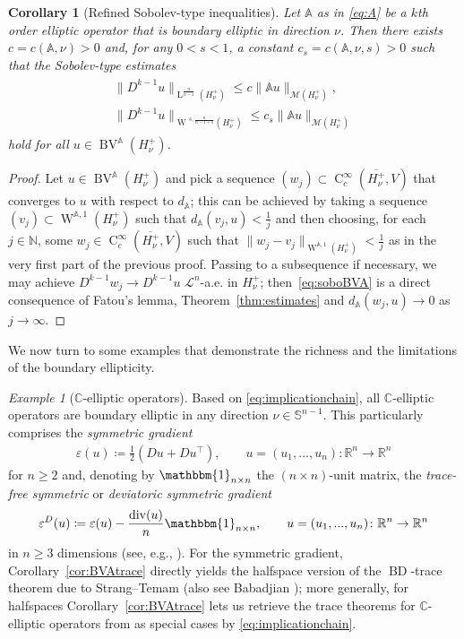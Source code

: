 \documentclass[a4paper,10pt]{amsart}
\newcommand{\R}{\mathbb R}
\renewcommand{\leq}{\leqslant}
\newcommand{\lebe}{\operatorname{L}}
\newcommand{\sobo}{\operatorname{W}}
\newcommand{\hold}{\operatorname{C}}
\newcommand{\bv}{\operatorname{BV}}
\newcommand{\A}{\mathbb{A}}
\newcommand{\bd}{\operatorname{BD}}
\numberwithin{equation}{section}
\newtheorem{corollary}[theorem]{Corollary}
\theoremstyle{remark}
\newtheorem{example}[theorem]{Example}
\numberwithin{equation}{section}
\begin{document}
	\begin{corollary}[Refined Sobolev-type inequalities]\label{cor:SobBVA}
		Let $\A$ as in \eqref{eq:A} be a $k$th order elliptic operator that is boundary elliptic in direction $\nu$.
		Then there exists $c=c(\A,\nu)>0$ and, for any $0<s<1$, a constant $c_{s}=c(\A,\nu,s)>0$ such that the Sobolev-type estimates
		\begin{align}\label{eq:soboBVA}
			\begin{split}
				\|D^{k-1}u\|_{\lebe^{\frac{n}{n-1}}(H^+_\nu)}\leq c\|\A u\|_{\mathcal M(H^+_\nu)},\\ 
				\|D^{k-1}u\|_{\dot{\sobo}{^{s,\frac{n}{n-1+s}}}(H^{+}_{\nu})}\leq c_{s}\|\A u\|_{\mathcal{M}(H^{+}_{\nu})}
			\end{split}
		\end{align}
		hold for all $u\in\bv^\A(H^+_\nu)$.
	\end{corollary} 
	\begin{proof}
		Let $u\in\bv^{\A}(H_{\nu}^{+})$ and pick a sequence $(w_{j})\subset\hold_{c}^{\infty}(\overline{H_{\nu}^{+}},V)$ that converges to $u$ with respect to $d_{\A}$; this can be achieved by taking a sequence $(v_{j})\subset\sobo^{\A,1}(H_{\nu}^{+})$ such that $d_{\A}(v_{j},u)<\frac{1}{j}$ and then choosing, for each $j\in\mathbb{N}$, some $w_{j}\in\hold_{c}^{\infty}(\overline{H_{\nu}^{+}},V)$ such that $\|w_{j}-v_{j}\|_{\sobo^{\A,1}(H_{\nu}^{+})}<\frac{1}{j}$ as in the very first part of the previous proof. Passing to a subsequence if necessary, we may achieve $D^{k-1}w_{j}\to D^{k-1}u$ $\mathscr{L}^{n}$-a.e. in $H_{\nu}^{+}$; then~\eqref{eq:soboBVA} is a direct consequence of Fatou's lemma, Theorem~\ref{thm:estimates} and $d_{\A}(w_{j},u)\to 0$ as $j\to\infty$. 
	\end{proof} 
	We now turn to some examples that demonstrate the richness and the limitations of the boundary ellipticity. 
	\begin{example}[$\mathbb{C}$-elliptic operators]
		Based on \eqref{eq:implicationchain}, all $\mathbb{C}$-elliptic operators are boundary elliptic in any direction $\nu\in\mathbb{S}^{n-1}$. This particularly comprises the \emph{symmetric gradient}
		\begin{align}\label{eq:symgrad}
			\varepsilon(u)\coloneqq\frac{1}{2}(Du+Du^{\top}),\qquad u=(u_{1},...,u_{n})\colon\R^{n}\to\R^{n}
		\end{align}
		for $n\geq 2$ and, denoting by $\mathbbm{1}_{n\times n}$ the $(n\times n)$-unit matrix, the \emph{trace-free symmetric} or \emph{deviatoric symmetric gradient}
		\begin{align}\label{eq:tfsym}
			\varepsilon^{D}(u)\coloneqq\varepsilon(u)-\frac{\mathrm{div}(u)}{n}\mathbbm{1}_{n\times n},\qquad u=(u_{1},...,u_{n})\colon\R^{n}\to\R^{n}
		\end{align}
		in $n\geq 3$ dimensions (see, e.g., \cite[Sec.~2]{BDG}). For the symmetric gradient, Corollary~\ref{cor:BVAtrace} directly yields the halfspace version of the $\bd$-trace theorem due to Strang--Temam \cite{StrangTemam} (also see Babadjian \cite{Babadjian}); more generally, for halfspaces Corollary~\ref{cor:BVAtrace} lets us retrieve the trace theorems for $\mathbb{C}$-elliptic operators  from \cite{BDG,DieGme21,GRVS} as special cases by \eqref{eq:implicationchain}. 
	\end{example}
\end{document}
